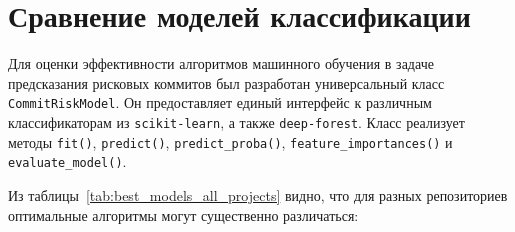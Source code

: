 \section{Сравнение моделей классификации}

Для оценки эффективности алгоритмов машинного обучения в задаче предсказания рисковых коммитов был разработан универсальный класс \texttt{CommitRiskModel}. Он предоставляет единый интерфейс к различным классификаторам из \texttt{scikit-learn}, а также \texttt{deep-forest}. Класс реализует методы \texttt{fit()}, \texttt{predict()}, \texttt{predict\_proba()}, \texttt{feature\_importances()} и \texttt{evaluate\_model()}.


\begin{table}[h!]
	\centering
	\caption{Лучшие модели классификации для каждого проекта}
	\label{tab:best_models_all_projects}
\end{table}

Из таблицы~\ref{tab:best_models_all_projects} видно, что для разных репозиториев оптимальные алгоритмы могут существенно различаться:

